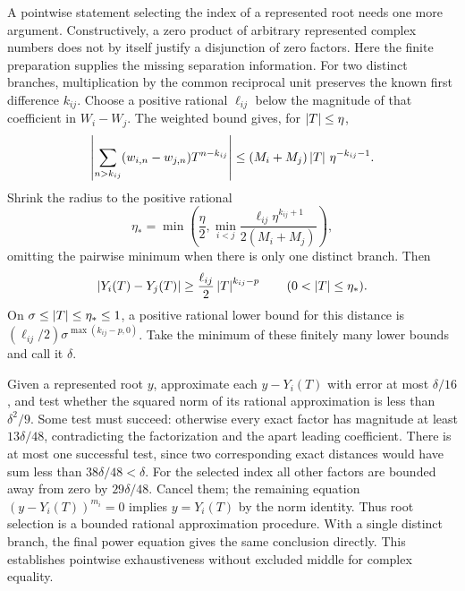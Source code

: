 A pointwise statement selecting the index of a represented root needs one
more argument. Constructively, a zero product of arbitrary represented
complex numbers does not by itself justify a disjunction of zero factors.
Here the finite preparation supplies the missing separation information.
For two distinct branches, multiplication by the common reciprocal unit
preserves the known first difference $k_{ij}$. Choose a positive rational
$\ell_{ij}$ below the magnitude of that coefficient in $W_i-W_j$.
The weighted bound gives, for $\left|T\right|\le\eta$,
\[
 \left|\sum_{n>k_{ij}}(w_{i,n}-w_{j,n})T^{n-k_{ij}}\right|
 \le(M_i+M_j)\left|T\right|\,\eta^{-k_{ij}-1}.
\]
Shrink the radius to the positive rational
\[
 \eta_* =\min\left(\frac\eta2,
  \min_{i<j}\frac{\ell_{ij}\eta^{k_{ij}+1}}{2(M_i+M_j)}\right),
\]
omitting the pairwise minimum when there is only one distinct branch.
Then
\[
 \left|Y_i(T)-Y_j(T)\right|
 \ge\frac{\ell_{ij}}2\left|T\right|^{k_{ij}-p}
 \qquad(0<\left|T\right|\le\eta_*).
\]
On $\sigma\le\left|T\right|\le\eta_*\le1$, a positive rational lower
bound for this distance is
$(\ell_{ij}/2)\sigma^{\max(k_{ij}-p,0)}$.
Take the minimum of these finitely many lower bounds and call it $\delta$.

Given a represented root $y$, approximate each $y-Y_i(T)$ with error
at most $\delta/16$, and test whether the squared norm of its rational
approximation is less than $\delta^2/9$. Some test must succeed:
otherwise every exact factor has magnitude at least $13\delta/48$,
contradicting the factorization and the apart leading coefficient.
There is at most one successful test, since two corresponding exact
distances would have sum less than $38\delta/48<\delta$.
For the selected index all other factors are bounded away from zero
by $29\delta/48$. Cancel them; the remaining equation
$(y-Y_i(T))^{m_i}=0$ implies $y=Y_i(T)$ by the norm identity.
Thus root selection is a bounded rational approximation procedure.
With a single distinct branch, the final power equation gives the same
conclusion directly. This establishes pointwise exhaustiveness without
excluded middle for complex equality.
